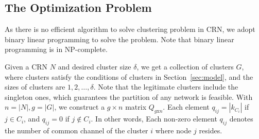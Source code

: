 \subsection{The Optimization Problem}

As there is no efficient algorithm to solve clustering problem in CRN, we adopt binary linear programming to solve the problem.
Note that binary linear programming is in NP-complete.







Given a CRN $N$ and desired cluster size $\delta$, we get a collection of clusters $G$, where clusters satisfy the conditions of clusters in Section~\ref{sec:model}, and the sizes of clusters are $1,2,\ldots,\delta$.
Note that the legitimate clusters include the singleton ones, which guarantees the partition of any network is feasible.
With $n=|N|,g=|G|$, we construct a $g\times n$ matrix $Q_{g\text{x}n}$. 
Each element $q_{ij}= |k_{C_i}|$ if $j\in C_i$, and $q_{ij}= 0$ if $j\notin C_i$.
In other words, Each non-zero element $q_{ij}$ denotes the number of common channel of the cluster $i$ where node $j$ resides.

